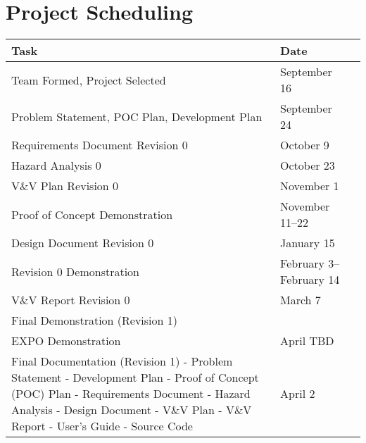 \documentclass{article}
\begin{document}
\section{Project Scheduling}


\noindent \begin{tabular}{ p{5.7cm} l r}
    
    \textbf{Task} & \textbf{Date} \\
    \toprule
    Team Formed, Project Selected & September 16 \\
 
    Problem Statement, POC Plan, Development Plan & September 24 \\
 
    Requirements Document Revision 0 & October 9 \\
 
    Hazard Analysis 0 & October 23 \\
 
    V\&V Plan Revision 0 & November 1 \\
 
    Proof of Concept Demonstration & November 11--22 \\
 
    Design Document Revision 0 & January 15 \\
 
    Revision 0 Demonstration & February 3--February 14\\
 
    V\&V Report Revision 0 & March 7 \\
 
    Final Demonstration (Revision 1) \\
 
    EXPO Demonstration & April TBD \\
 
    Final Documentation (Revision 1)\newline 
     - Problem Statement\newline
     - Development Plan\newline
     - Proof of Concept (POC) Plan\newline
     - Requirements Document\newline
     - Hazard Analysis\newline
     - Design Document\newline
     - V\&V Plan\newline
     - V\&V Report\newline
     - User's Guide\newline
     - Source Code\newline &  April 2\\
   
 \end{tabular}
 
\end{document}
